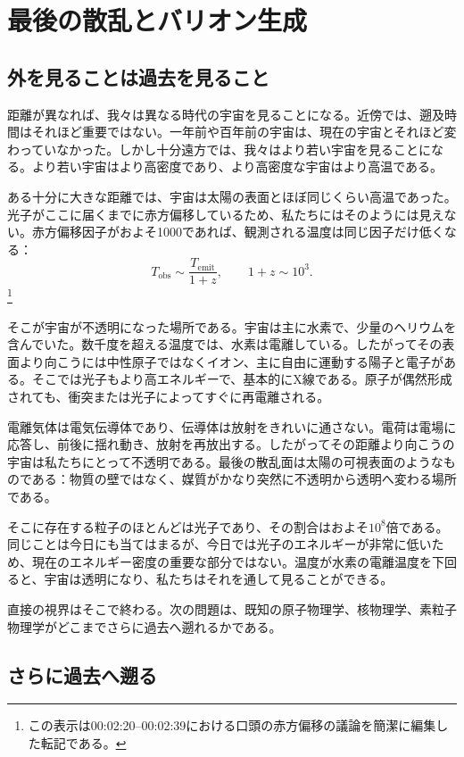 \chapter{最後の散乱とバリオン生成}

\section{外を見ることは過去を見ること}

距離が異なれば、我々は異なる時代の宇宙を見ることになる。近傍では、遡及時間はそれほど重要ではない。一年前や百年前の宇宙は、現在の宇宙とそれほど変わっていなかった。しかし十分遠方では、我々はより若い宇宙を見ることになる。より若い宇宙はより高密度であり、より高密度な宇宙はより高温である。

ある十分に大きな距離では、宇宙は太陽の表面とほぼ同じくらい高温であった。光子がここに届くまでに赤方偏移しているため、私たちにはそのようには見えない。赤方偏移因子がおよそ1000であれば、観測される温度は同じ因子だけ低くなる：
\[
T_{\mathrm{obs}} \sim \frac{T_{\mathrm{emit}}}{1+z},
\qquad
1+z \sim 10^3.
\]\footnote{この表示は00:02:20--00:02:39における口頭の赤方偏移の議論を簡潔に編集した転記である。}

そこが宇宙が不透明になった場所である。宇宙は主に水素で、少量のヘリウムを含んでいた。数千度を超える温度では、水素は電離している。したがってその表面より向こうには中性原子ではなくイオン、主に自由に運動する陽子と電子がある。そこでは光子もより高エネルギーで、基本的にX線である。原子が偶然形成されても、衝突または光子によってすぐに再電離される。

電離気体は電気伝導体であり、伝導体は放射をきれいに通さない。電荷は電場に応答し、前後に揺れ動き、放射を再放出する。したがってその距離より向こうの宇宙は私たちにとって不透明である。最後の散乱面は太陽の可視表面のようなものである：物質の壁ではなく、媒質がかなり突然に不透明から透明へ変わる場所である。

そこに存在する粒子のほとんどは光子であり、その割合はおよそ\(10^8\)倍である。同じことは今日にも当てはまるが、今日では光子のエネルギーが非常に低いため、現在のエネルギー密度の重要な部分ではない。温度が水素の電離温度を下回ると、宇宙は透明になり、私たちはそれを通して見ることができる。

直接の視界はそこで終わる。次の問題は、既知の原子物理学、核物理学、素粒子物理学がどこまでさらに過去へ遡れるかである。

\section{さらに過去へ遡る}

